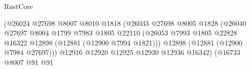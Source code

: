 \begin{lexlean}{RustCore}
\begin{coremodule}
                                                              (@26024
                                                                @27698
                                                                @8007
                                                                @8010
                                                                @1818
                                                                (@26033
                                                                  @27698
                                                                  @8005
                                                                  @1828
                                                                  (@26040
                                                                    @27697
                                                                    @8004
                                                                    @1799
                                                                    @7983
                                                                    @1805
                                                                    @22110
                                                                    (@26053
                                                                      @7993
                                                                      @1805
                                                                      @22828
                                                                      @16322
                                                                      @12898
                                                                      (@12881 (@12900 @7994 @1821)))
                                                                    @12898
                                                                    (@12881 (@12900 @7984 @27697)))
                                                                  @12916
                                                                  @12920
                                                                  @12925
                                                                  @12930
                                                                  @12936
                                                                  @16342)
                                                                (@16733
                                                                  @8007
                                                                  @91
                                                                  @91

\end{coremodule}
\end{lexlean}
